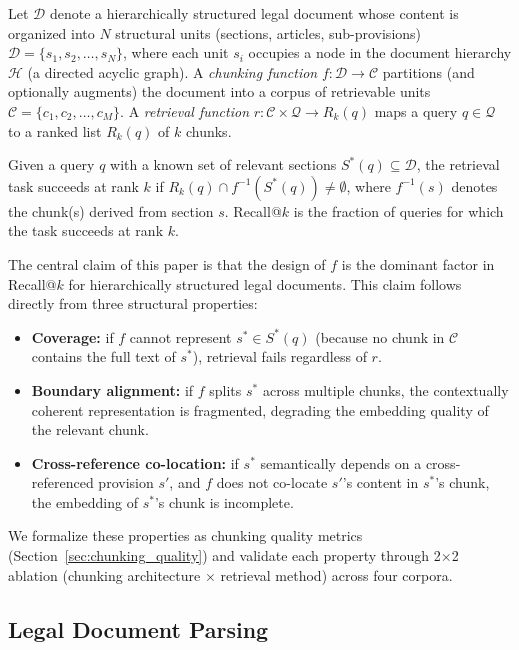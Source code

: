 \documentclass[sn-mathphys,Numbered]{sn-jnl}%
\begin{document}
Let $\mathcal{D}$ denote a hierarchically structured legal document whose
content is organized into $N$ structural units (sections, articles,
sub-provisions) $\mathcal{D} = \{s_1, s_2, \ldots, s_N\}$, where each
unit $s_i$ occupies a node in the document hierarchy $\mathcal{H}$
(a directed acyclic graph).  A \emph{chunking function}
$f: \mathcal{D} \to \mathcal{C}$ partitions (and optionally augments)
the document into a corpus of retrievable units
$\mathcal{C} = \{c_1, c_2, \ldots, c_M\}$.  A \emph{retrieval function}
$r: \mathcal{C} \times \mathcal{Q} \to R_k(q)$ maps a query
$q \in \mathcal{Q}$ to a ranked list $R_k(q)$ of $k$ chunks.

Given a query $q$ with a known set of relevant sections
$S^*(q) \subseteq \mathcal{D}$, the retrieval task succeeds at rank $k$
if $R_k(q) \cap f^{-1}(S^*(q)) \neq \emptyset$, where $f^{-1}(s)$
denotes the chunk(s) derived from section $s$.  Recall@$k$ is the
fraction of queries for which the task succeeds at rank $k$.

The central claim of this paper is that the design of $f$ is the dominant
factor in Recall@$k$ for hierarchically structured legal documents.
This claim follows directly from three structural properties:

\begin{itemize}
  \item \textbf{Coverage:} if $f$ cannot represent $s^* \in S^*(q)$
        (because no chunk in $\mathcal{C}$ contains the full text of
        $s^*$), retrieval fails regardless of $r$.
  \item \textbf{Boundary alignment:} if $f$ splits $s^*$ across multiple
        chunks, the contextually coherent representation is fragmented,
        degrading the embedding quality of the relevant chunk.
  \item \textbf{Cross-reference co-location:} if $s^*$ semantically
        depends on a cross-referenced provision $s'$, and $f$ does not
        co-locate $s'$'s content in $s^*$'s chunk, the embedding of
        $s^*$'s chunk is incomplete.
\end{itemize}

We formalize these properties as chunking quality metrics
(Section~\ref{sec:chunking_quality}) and validate each property through
2$\times$2 ablation (chunking architecture $\times$ retrieval method)
across four corpora.

\subsection{Legal Document Parsing}
\end{document}
